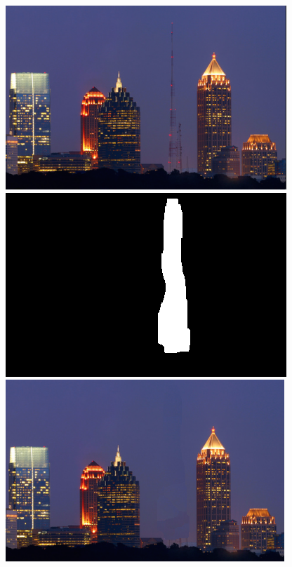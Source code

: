 \documentclass[a4paper, 10pt]{article}
\begin{document}
\begin{figure}
\begin{minipage}{.4\textwidth}
\centering
\includegraphics[scale=0.25]{images/skyline.png}
\end{minipage}%
\begin{minipage}{.4\textwidth}
\centering
\includegraphics[scale=0.25]{skyline-mask.png}
\end{minipage}%
\begin{minipage}{.4\textwidth}
\centering
\includegraphics[scale=0.25]{inpainted_skyline17.png}
\end{minipage}%
\end{figure}
\end{document}
